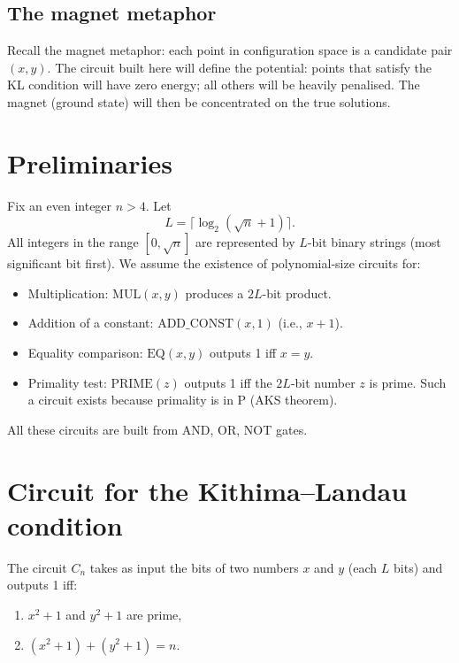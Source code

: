 \documentclass[11pt,a4paper]{article}
\begin{document}
\subsection{The magnet metaphor}

Recall the magnet metaphor: each point in configuration space is a candidate pair \((x,y)\). The circuit built here will define the potential: points that satisfy the KL condition will have zero energy; all others will be heavily penalised. The magnet (ground state) will then be concentrated on the true solutions.

\section{Preliminaries}

Fix an even integer \(n > 4\). Let
\[
L = \lceil \log_{2}(\sqrt{n}+1)\rceil.
\]
All integers in the range \([0,\sqrt{n}]\) are represented by \(L\)-bit binary strings (most significant bit first). We assume the existence of polynomial‑size circuits for:
\begin{itemize}
\item Multiplication: \(\mathrm{MUL}(x,y)\) produces a \(2L\)-bit product.
\item Addition of a constant: \(\mathrm{ADD\_CONST}(x,1)\) (i.e., \(x+1\)).
\item Equality comparison: \(\mathrm{EQ}(x,y)\) outputs 1 iff \(x = y\).
\item Primality test: \(\mathrm{PRIME}(z)\) outputs 1 iff the \(2L\)-bit number \(z\) is prime. Such a circuit exists because primality is in P (AKS theorem).
\end{itemize}
All these circuits are built from AND, OR, NOT gates.

\section{Circuit for the Kithima–Landau condition}

The circuit \(C_{n}\) takes as input the bits of two numbers \(x\) and \(y\) (each \(L\) bits) and outputs 1 iff:
\begin{enumerate}
\item \(x^{2}+1\) and \(y^{2}+1\) are prime,
\item \((x^{2}+1)+(y^{2}+1) = n\).
\end{enumerate}
\end{document}

